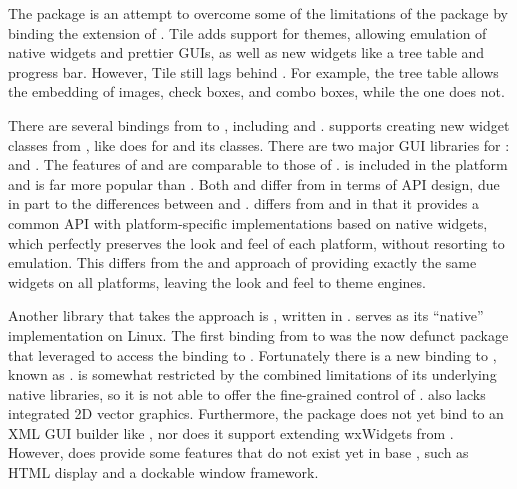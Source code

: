 \documentclass[article]{jss}
\begin{document}
The  package \citep{tcltk2} is an attempt to overcome some
of the limitations of the  package by binding the  extension
\citep{tcltk-tile} of . Tile adds support for themes, allowing
emulation of native widgets and prettier GUIs, as well as new widgets
like a tree table and progress bar. However, Tile still lags behind
. For example, the  tree table allows the embedding of images,
check boxes, and combo boxes, while the  one does not.

There are several bindings from  to , including  \citep{sjava}
and  \citep{rjava}.  supports creating
new  widget classes from , like  does for 
 and its  classes. There are two major GUI libraries for 
:  and . The features
of  and  are comparable to those of .  is included
in the  platform and is far more popular than . Both 
and  differ from  in terms of API design, due in part
to the differences between  and .  differs 
from  and  in that it provides a common API with 
platform-specific implementations based on native widgets, which perfectly 
preserves the look and feel of each platform, without resorting to emulation. 
This differs from the  and  approach of providing exactly 
the same widgets on all platforms, leaving the look and feel to theme engines.

Another library that takes the  approach is  \citep{wxwidgets},
written in .  serves as its {}``native'' implementation on
Linux. The first binding from  to  was the now defunct 
package that leveraged  to access the  binding to .
Fortunately there is a new binding to , known as 
\citep{RwxWidgets}.  is somewhat restricted by the combined
limitations of its underlying native libraries, so it is not able
to offer the fine-grained control of .  also lacks integrated
2D vector graphics. Furthermore, the  package does not yet
bind to an XML GUI builder like , nor does it support
extending wxWidgets from . However,  does provide some
features that do not exist yet in base , such as HTML display
and a dockable window framework. 
\end{document}
